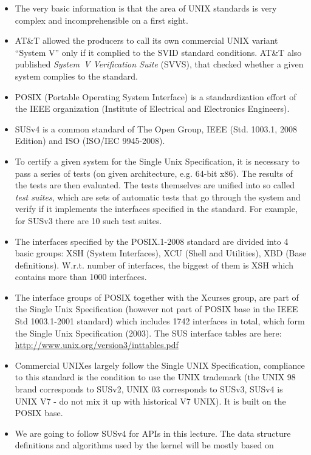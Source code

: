 \begin{itemize}
\item The very basic information is that the area of UNIX standards is very
complex and incomprehensible on a first sight.
\item AT\&T allowed the producers to call its own commercial UNIX variant
``System V'' only if it complied to the SVID standard conditions. AT\&T also
published \emph{System~V Verification Suite} (SVVS), that checked whether a given
system complies to the standard.
\item POSIX (Portable Operating System Interface) is a standardization effort
of the IEEE organization (Institute of Electrical and Electronics Engineers).
\item SUSv4 is a common standard of The Open Group, IEEE (Std. 1003.1, 2008
Edition) and ISO (ISO/IEC 9945-2008).
\item To certify a given system for the Single Unix Specification, it is necessary
to pass a series of tests (on given architecture, e.g. 64-bit x86).
The results of the tests are then evaluated. The tests themselves are unified into
so called \emph{test suites}, which are sets of automatic tests that go through
the system and verify if it implements the interfaces specified in the standard.
For example, for SUSv3 there are 10 such test suites.
\item The interfaces specified by the POSIX.1-2008 standard are divided into 4
basic groups: XSH (System Interfaces), XCU (Shell and Utilities), XBD
(Base definitions). W.r.t. number of interfaces, the biggest of them is XSH which
contains more than 1000 interfaces.
\item The interface groups of POSIX together with the Xcurses group, are part
of the Single Unix Specification (however not part of POSIX base in the IEEE Std
1003.1-2001 standard) which includes 1742 interfaces in total, which form the Single Unix
Specification (2003). The SUS interface tables are here:
\url{http://www.unix.org/version3/inttables.pdf}
\item Commercial UNIXes largely follow the Single UNIX Specification, compliance
to this standard is the condition to use the UNIX trademark 
(the UNIX 98 brand corresponds to SUSv2, UNIX 03 corresponds to SUSv3, SUSv4 is
UNIX V7 - do not mix it up with historical V7 UNIX). It is built on the POSIX
base.
\item We are going to follow SUSv4 for APIs in this lecture. The data structure
definitions and algorithms used by the kernel will be mostly based on

\end{itemize}
